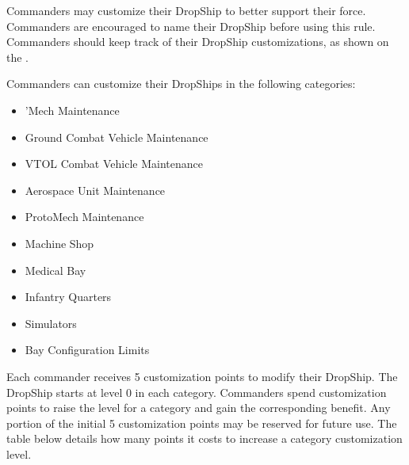Commanders may customize their DropShip to better support their force.
Commanders are encouraged to name their DropShip before using this rule.
Commanders should keep track of their DropShip customizations, as shown on the .

Commanders can customize their DropShips in the following categories:


\begin{itemize}

  \item 'Mech Maintenance

  \item Ground Combat Vehicle Maintenance

  \item VTOL Combat Vehicle Maintenance

  \item Aerospace Unit Maintenance

  \item ProtoMech Maintenance

  \item Machine Shop

  \item Medical Bay

  \item Infantry Quarters

  \item Simulators

  \item Bay Configuration Limits

\end{itemize}


Each commander receives 5 customization points to modify their DropShip.
The DropShip starts at level 0 in each category.
Commanders spend customization points to raise the level for a category and gain the corresponding benefit.
Any portion of the initial 5 customization points may be reserved for future use.
The table below details how many points it costs to increase a category customization level.

